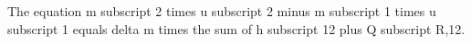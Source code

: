 The equation m subscript 2 times u subscript 2 minus m subscript 1 times u subscript 1 equals delta m times the sum of h subscript 12 plus Q subscript R,12.